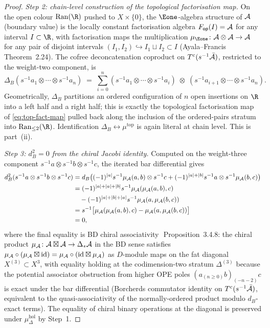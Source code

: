 \begin{proof}
\emph{Step 2: chain-level construction of the topological
factorisation map.}
On the open colour $\Ran(\R)$ pushed to $X\times\{0\}$, the
$\Eone$-algebra structure of $\mathcal{A}$ (boundary value) is the
locally constant factorisation algebra
$F_{\mathsf{op}}(I)=\mathcal{A}$ for any interval $I\subset\R$, with
factorisation maps the multiplication
$\mu_{\Eone}\colon\cA\otimes\cA\to\cA$ for any pair of disjoint
intervals $(I_1,I_2)\hookrightarrow I_1\sqcup I_2\subset I$
(Ayala--Francis~\cite{AF15}\,Theorem~2.24). The cofree
deconcatenation coproduct on $T^c(s^{-1}\bar{\mathcal{A}})$, restricted to the
weight-two component, is
\[
 \Delta_B(s^{-1}a_1\otimes\cdots\otimes s^{-1}a_n)
 \;=\;
 \sum_{i=0}^{n}
 (s^{-1}a_1\otimes\cdots\otimes s^{-1}a_i)\;\otimes\;
 (s^{-1}a_{i+1}\otimes\cdots\otimes s^{-1}a_n).
\]
Geometrically, $\Delta_B$ partitions an ordered configuration of
$n$ open insertions on $\R$ into a left half and a right half;
this is exactly the topological factorisation map of
\eqref{eq:top-fact-map} pulled back along the inclusion of the
ordered-pairs stratum into $\Ran_{\leq 2}(\R)$. Identification
$\Delta_B\leftrightarrow\mu^{\mathrm{top}}$ is again literal at
chain level. This is part~(ii).

\emph{Step 3: $d_B^2=0$ from the chiral Jacobi identity.}
Computed on the weight-three component
$s^{-1}a\otimes s^{-1}b\otimes s^{-1}c$, the iterated
bar differential gives
\begin{align*}
 d_B^2(s^{-1}a\otimes s^{-1}b\otimes s^{-1}c)
 &= d_B\bigl((-1)^{|a|}s^{-1}\mu_{\mathcal{A}}(a,b)\otimes s^{-1}c
 + (-1)^{|a|+|b|}s^{-1}a\otimes s^{-1}\mu_{\mathcal{A}}(b,c)\bigr) \\
 &= (-1)^{|a|+|a|+|b|}s^{-1}\mu_{\mathcal{A}}(\mu_{\mathcal{A}}(a,b),c) \\
 &\quad - (-1)^{|a|+|b|+|a|}s^{-1}\mu_{\mathcal{A}}(a,\mu_{\mathcal{A}}(b,c)) \\
 &= s^{-1}\bigl[\mu_{\mathcal{A}}(\mu_{\mathcal{A}}(a,b),c)-\mu_{\mathcal{A}}(a,\mu_{\mathcal{A}}(b,c))\bigr] \\
 &= 0,
\end{align*}
where the final equality is BD chiral
associativity~\cite{BD04}\,Proposition~3.4.8: the chiral product
$\mu_{\mathcal{A}}\colon \mathcal{A}\boxtimes\mathcal{A}\to\Delta_*\mathcal{A}$ in the BD sense
satisfies $\mu_{\mathcal{A}}\circ(\mu_{\mathcal{A}}\boxtimes\mathrm{id})
=\mu_{\mathcal{A}}\circ(\mathrm{id}\boxtimes\mu_{\mathcal{A}})$ as $D$-module maps on the fat
diagonal $X^{(3)}\subset X^3$, with equality holding at the
codimension-two stratum $\Delta^{(3)}$ because the potential
associator obstruction from higher OPE poles
$(a_{(n\geq 0)}b)_{(-n-2)}c$ is exact under the bar differential
(Borcherds commutator identity on $T^c(s^{-1}\bar{\mathcal{A}})$, equivalent
to the quasi-associativity of the normally-ordered product modulo
$d_B$-exact terms). The equality of chiral binary operations at
the diagonal is preserved under $\mu^{\mathrm{hol}}_\Delta$ by
Step~1.


\end{proof}
